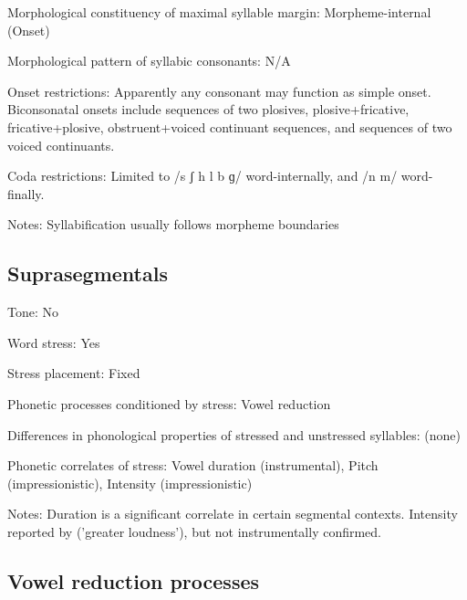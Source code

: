 {\begin{appendixdesc}
\item[Morphological constituency of maximal syllable margin:] Morpheme-internal (Onset)

\item[Morphological pattern of syllabic consonants:] N/A

\item[Onset restrictions:] Apparently any consonant may function as simple onset. Biconsonatal onsets include sequences of two plosives, plosive+fricative, fricative+plosive, obstruent+voiced continuant sequences, and sequences of two voiced continuants.

\item[Coda restrictions:] Limited to /s ʃ h l b ɡ/ word-internally, and /n m/ word-finally.

\item[Notes:] Syllabification usually follows morpheme boundaries
\end{appendixdesc}
\subsection*{Suprasegmentals}
\begin{appendixdesc}
\item[Tone:] No

\item[Word stress:] Yes

\item[Stress placement:] Fixed

\item[Phonetic processes conditioned by stress:] Vowel reduction

\item[Differences in phonological properties of stressed and unstressed syllables:] (none)

\item[Phonetic correlates of stress:] Vowel duration (instrumental), Pitch (impressionistic), Intensity (impressionistic)

\item[Notes:] Duration is a significant correlate in certain segmental contexts. Intensity reported by \citet{LakotaLanguageConsortium2008} (’greater loudness’), but not instrumentally confirmed.
\end{appendixdesc}
\subsection*{Vowel reduction processes}
\begin{appendixdesc}


\end{appendixdesc}}
